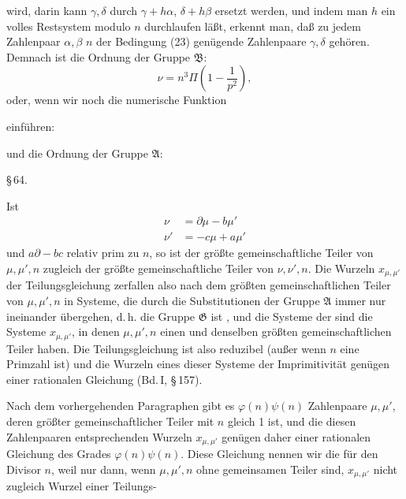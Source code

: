 wird, darin kann $\gamma, \delta$ durch $\gamma + h\alpha$, $\delta + h\beta$ ersetzt werden,
und indem man $h$ ein volles Restsystem modulo $n$ durchlaufen
läßt, erkennt man, daß zu jedem Zahlenpaar $\alpha, \beta$ $n$ der Bedingung
(23) genügende Zahlenpaare $\gamma, \delta$ gehören. Demnach ist die Ordnung der
Gruppe $\mathfrak{B}$:
\[
\nu = n^3 \Pi\left(1 - \frac{1}{p^2}\right),
\]
oder, wenn wir noch die numerische Funktion

einführen:

und die Ordnung der Gruppe $\mathfrak{A}$:


\begin{center}
\S\,64. 
\end{center}
Ist
\[
\begin{aligned}
\nu &= \partial\mu - b\mu'\\
\nu' &= -c\mu + a\mu'
\end{aligned}
\]
und $a\partial - bc$ relativ prim zu $n$, so ist der größte gemeinschaftliche
Teiler von $\mu, \mu', n$ zugleich der größte gemeinschaftliche
Teiler von $\nu, \nu', n$. Die Wurzeln $x_{\mu,\mu'}$ der Teilungsgleichung
zerfallen also nach dem größten gemeinschaftlichen Teiler von
$\mu, \mu', n$ in Systeme, die durch die Substitutionen der Gruppe $\mathfrak{A}$
immer nur ineinander übergehen, d.\,h. die Gruppe $\mathfrak{G}$ ist , %
und die Systeme der  sind die
Systeme $x_{\mu,\mu'}$, in denen $\mu, \mu', n$ einen und denselben größten
gemeinschaftlichen Teiler haben. Die Teilungsgleichung ist also
reduzibel (außer wenn $n$ eine Primzahl ist) und die Wurzeln
eines dieser Systeme der Imprimitivität %
genügen einer rationalen
Gleichung (Bd.\,I, \S\,157).

Nach dem vorhergehenden Paragraphen gibt es $\varphi(n)\psi(n)$
Zahlenpaare $\mu, \mu'$, deren größter gemeinschaftlicher Teiler mit $n$
gleich 1 ist, und die diesen Zahlenpaaren entsprechenden Wurzeln
$x_{\mu,\mu'}$ genügen daher einer rationalen Gleichung des Grades $\varphi(n)\psi(n)$.
Diese Gleichung nennen wir die 
für den Divisor $n$, weil nur dann, wenn $\mu, \mu', n$ ohne gemeinsamen
Teiler sind, $x_{\mu,\mu'}$ nicht zugleich Wurzel einer Teilungs-
